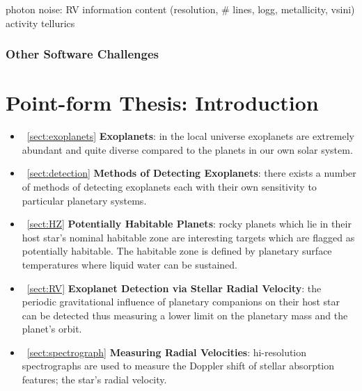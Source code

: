 photon noise: RV information content (resolution, \# lines, logg, metallicity, vsini)
activity
tellurics

\subsubsection{Other Software Challenges}


\section{Point-form Thesis: Introduction}
\begin{itemize}
\renewcommand\labelitemi{--}
\item~\ref{sect:exoplanets} \textbf{Exoplanets}: in the local universe exoplanets are 
extremely abundant and quite diverse compared to the planets in our own solar system.
\item~\ref{sect:detection} \textbf{Methods of Detecting Exoplanets}: there exists a 
number of methods of detecting exoplanets each with their own sensitivity to particular 
planetary systems.
\item~\ref{sect:HZ} \textbf{Potentially Habitable Planets}: rocky planets which lie in 
their host star's nominal habitable zone are interesting targets which are flagged as 
potentially habitable. The habitable zone is defined by planetary surface temperatures 
where liquid water can be sustained.  
\item~\ref{sect:RV} \textbf{Exoplanet Detection via Stellar Radial Velocity}: the 
periodic gravitational influence of planetary companions on their host star can be 
detected thus measuring a lower limit on the planetary mass and the planet's orbit.
\item~\ref{sect:spectrograph} \textbf{Measuring Radial Velocities}: hi-resolution 
spectrographs are used to measure the Doppler shift of stellar absorption features; 
the star's radial velocity.
\end{itemize}
